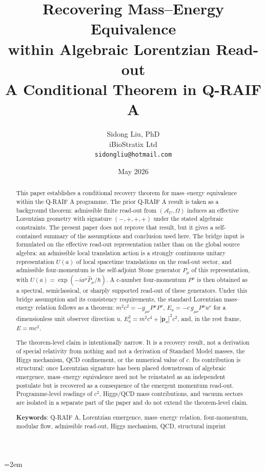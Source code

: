 \documentclass[12pt,a4paper]{article}
\title{%
  \textbf{Recovering Mass--Energy Equivalence}\\
  \textbf{within Algebraic Lorentzian Read-out}\\
  \large A Conditional Theorem in Q-RAIF A%
}
\author{
  Sidong Liu, PhD \\
  \small iBioStratix Ltd \\
  \small \texttt{sidongliu@hotmail.com}
}
\date{May 2026}
\theoremstyle{definition}
\theoremstyle{remark}
\newcommand{\AU}{\mathcal{A}_U}
\newcommand{\Omegastate}{\Omega}
\begin{document}
\emergencystretch=2em
\raggedbottom
{}

\maketitle

\begin{abstract}
This paper establishes a conditional recovery theorem for mass--energy equivalence within the Q-RAIF A programme. The prior Q-RAIF A result is taken as a background theorem: admissible finite read-out from $(\AU,\Omegastate)$ induces an effective Lorentzian geometry with signature $(-,+,+,+)$ under the stated algebraic constraints. The present paper does not reprove that result, but it gives a self-contained summary of the assumptions and conclusion used here. The bridge input is formulated on the effective read-out representation rather than on the global source algebra: an admissible local translation action is a strongly continuous unitary representation $U(a)$ of local spacetime translations on the read-out sector, and admissible four-momentum is the self-adjoint Stone generator $\hat P_\mu$ of this representation, with $U(a)=\exp(-i a^\mu\hat P_\mu/\hbar)$. A c-number four-momentum $P^\mu$ is then obtained as a spectral, semiclassical, or sharply supported read-out of these generators. Under this bridge assumption and its consistency requirements, the standard Lorentzian mass--energy relation follows as a theorem: $m^2c^2=-g_{\mu\nu}P^\mu P^\nu$, $E_u=-c\,g_{\mu\nu}P^\mu u^\nu$ for a dimensionless unit observer direction $u$, $E_u^2=m^2c^4+|\mathbf p_u|^2c^2$, and, in the rest frame, $E=mc^2$.

The theorem-level claim is intentionally narrow. It is a recovery result, not a derivation of special relativity from nothing and not a derivation of Standard Model masses, the Higgs mechanism, QCD confinement, or the numerical value of $c$. Its contribution is structural: once Lorentzian signature has been placed downstream of algebraic emergence, mass--energy equivalence need not be reinstated as an independent postulate but is recovered as a consequence of the emergent momentum read-out. Programme-level readings of $c^2$, Higgs/QCD mass contributions, and vacuum sectors are isolated in a separate part of the paper and do not extend the theorem-level claim.

\medskip
\noindent\textbf{Keywords}: Q-RAIF A, Lorentzian emergence, mass--energy relation, four-momentum, modular flow, admissible read-out, Higgs mechanism, QCD, structural imprint
\end{abstract}
\end{document}
